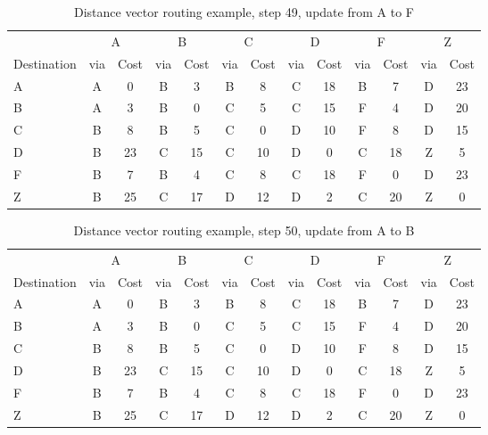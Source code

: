 \begin{table}
    \caption{Distance vector  routing example, step 49, update from A to F }
    \label{tab:dv:step:49}
\begin{tabular}{l|c|c|c|c|c|c|c|c|c|c|c|c}
    \toprule
      & \multicolumn{2}{c|}{A}&\multicolumn{2}{c|}{B}&\multicolumn{2}{c|}{C}&\multicolumn{2}{c|}{D}&\multicolumn{2}{c|}{F}&\multicolumn{2}{c|}{Z} \\
    Destination & via&Cost&via&Cost&via&Cost&via&Cost&via&Cost&via&Cost \\ 
    \midrule
    A & A & 0 &B & 3 &B & 8 &C & 18 &B & 7 &D & 23 
 \\B & A & 3 &B & 0 &C & 5 &C & 15 &F & 4 &D & 20 
 \\C & B & 8 &B & 5 &C & 0 &D & 10 &F & 8 &D & 15 
 \\D & B & 23 &C & 15 &C & 10 &D & 0 &C & 18 &Z & 5 
 \\F & B & 7 &B & 4 &C & 8 &C & 18 &F & 0 &D & 23 
 \\Z & B & 25 &C & 17 &D & 12 &D & 2 &C & 20 &Z & 0 
    \\ \bottomrule 
\end{tabular}
\end{table}
    

\begin{table}
    \caption{Distance vector  routing example, step 50, update from A to B }
    \label{tab:dv:step:50}
\begin{tabular}{l|c|c|c|c|c|c|c|c|c|c|c|c}
    \toprule
      & \multicolumn{2}{c|}{A}&\multicolumn{2}{c|}{B}&\multicolumn{2}{c|}{C}&\multicolumn{2}{c|}{D}&\multicolumn{2}{c|}{F}&\multicolumn{2}{c|}{Z} \\
    Destination & via&Cost&via&Cost&via&Cost&via&Cost&via&Cost&via&Cost \\ 
    \midrule
    A & A & 0 &B & 3 &B & 8 &C & 18 &B & 7 &D & 23 
 \\B & A & 3 &B & 0 &C & 5 &C & 15 &F & 4 &D & 20 
 \\C & B & 8 &B & 5 &C & 0 &D & 10 &F & 8 &D & 15 
 \\D & B & 23 &C & 15 &C & 10 &D & 0 &C & 18 &Z & 5 
 \\F & B & 7 &B & 4 &C & 8 &C & 18 &F & 0 &D & 23 
 \\Z & B & 25 &C & 17 &D & 12 &D & 2 &C & 20 &Z & 0 
    \\ \bottomrule 
\end{tabular}
\end{table}
    
